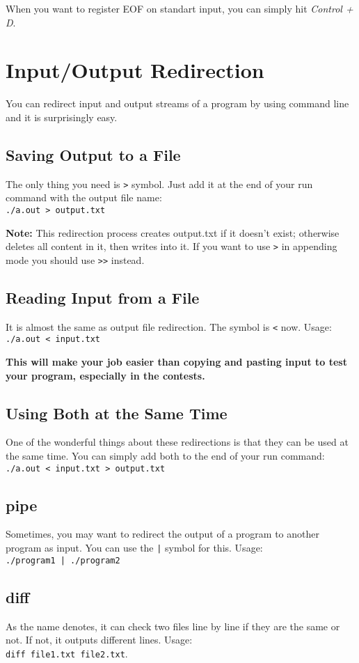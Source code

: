 \documentclass[12pt]{article}
\begin{document}
When you want to register EOF on standart input, you can simply hit \emph{Control + D}.

\section{Input/Output Redirection}
You can redirect input and output streams of a program by using command line and it is surprisingly easy.
\subsection{Saving Output to a File}
The only thing you need is \texttt{>} symbol. Just add it at the end of your run command with the output file name:\\
\texttt{./a.out > output.txt}

\textbf{Note:} This redirection process creates output.txt if it doesn't exist; otherwise deletes all content in it, then writes into it. If you want to use \texttt{>} in appending mode you should use \texttt{>>} instead.

\subsection{Reading Input from a File}
It is almost the same as output file redirection. The symbol is \texttt{<} now. Usage: \\
\texttt{./a.out < input.txt}


\textbf{This will make your job easier than copying and pasting input to test your program, especially in the contests.}

\subsection{Using Both at the Same Time}
One of the wonderful things about these redirections is that they can be used at the same time. You can simply add both to the end of your run command:\\
\texttt{./a.out < input.txt > output.txt}

\subsection{pipe}
Sometimes, you may want to redirect the output of a program to another program as input. You can use the \texttt{|} symbol for this. Usage:\\
\texttt{./program1 | ./program2}

\subsection{diff}
As the name denotes, it can check two files line by line if they are the same or not. If not, it outputs different lines. Usage:\\
\texttt{diff file1.txt file2.txt}.
\end{document}
